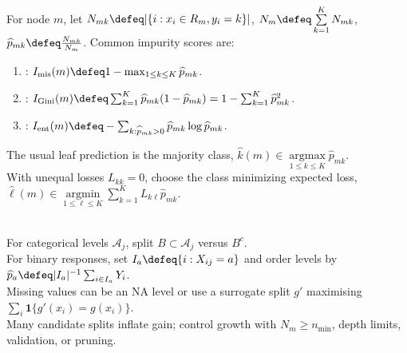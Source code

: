 \begin{definition} \label{def:sl-classification-tree-impurity} \\
For node $m$, let $N_{mk}\defeq|\{i:x_i\in R_m,y_i=k\}|$, $N_m\defeq\sum\limits_{k=1}^K N_{mk}$, $\widehat{p}_{mk}\defeq \frac{N_{mk}}{N_m}$. Common impurity scores are:
\begin{enumerate}[label=(\roman*)]
\setlength{\itemsep}{0pt}
\item {}: $I_{\mathrm{mis}}(m)\defeq1-\max_{1\leq k\leq K}\widehat{p}_{mk}$.
\item {}: $I_{\mathrm{Gini}}(m)\defeq\sum_{k=1}^K\widehat{p}_{mk}(1-\widehat{p}_{mk})=1-\sum_{k=1}^K\widehat{p}_{mk}^2$.
\item {}: $I_{\mathrm{ent}}(m)\defeq-\sum_{k:\widehat{p}_{mk}>0}\widehat{p}_{mk}\log\widehat{p}_{mk}$.
\end{enumerate}
The usual leaf prediction is the majority class, $\widehat{k}(m)\in\operatorname*{argmax}\limits_{1\leq k\leq K}\widehat{p}_{mk}$. \\
With unequal losses $L_{kk}=0$, choose the class minimizing expected loss, $\widehat{\ell}(m)\in\operatorname*{argmin}\limits_{1\leq\ell\leq K}\sum_{k=1}^K L_{k\ell}\widehat{p}_{mk}$.
\end{definition}

\begin{remark} \label{rem:sl-tree-practical-issues} \\
For categorical levels $\mathcal{A}_j$, split $B\subset\mathcal{A}_j$ versus $B^c$.\\
For binary responses, set $I_a\defeq\{i:X_{ij}=a\}$ and order levels by $\widehat{p}_a\defeq |I_a|^{-1}\sum_{i\in I_a}Y_i$.\\
Missing values can be an $\mathrm{NA}$ level or use a surrogate split $g'$ maximising $\sum_i\mathbf{1}\{g'(x_i)=g(x_i)\}$.\\
Many candidate splits inflate gain; control growth with $N_m\geq n_{\min}$, depth limits, validation, or pruning.
\end{remark}
